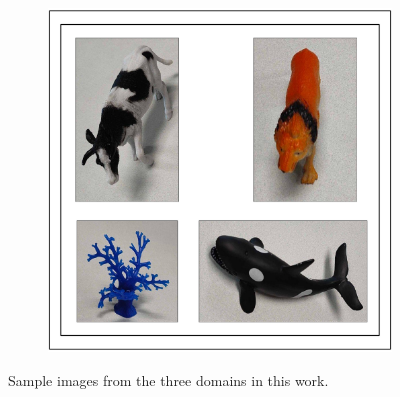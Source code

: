 \begin{figure}[]
\begin{subfigure}{0.25\textwidth}
\end{subfigure}
\hspace{0.04\textwidth}
%
\begin{subfigure}{0.25\textwidth}
\includegraphics[width=\textwidth]{figures/Figure_3C.pdf}
\end{subfigure}
\caption{Sample images from the three domains in this work.}
\label{fig:sampled_figures}
\end{figure}



